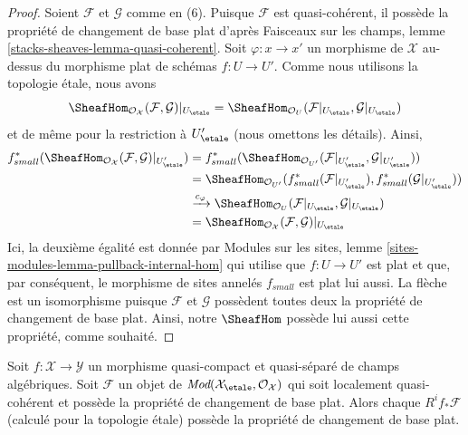 \begin{proof}
\medskip\noindent
Soient $\mathcal{F}$ et $\mathcal{G}$ comme en (6). Puisque $\mathcal{F}$
est quasi-cohérent, il possède la propriété de changement de base plat d'après
Faisceaux sur les champs, lemme \ref{stacks-sheaves-lemma-quasi-coherent}.
Soit $\varphi : x \to x'$ un morphisme de $\mathcal{X}$ au-dessus
du morphisme plat de schémas $f : U \to U'$.
Comme nous utilisons la topologie étale, nous avons
$$
\SheafHom_{\mathcal{O}_\mathcal{X}}(\mathcal{F}, \mathcal{G})|_{U_\etale} =
\SheafHom_{\mathcal{O}_U}(\mathcal{F}|_{U_\etale}, \mathcal{G}|_{U_\etale})
$$
et de même pour la restriction à $U'_\etale$ (nous omettons les détails). Ainsi,
\begin{align*}
f_{small}^*(
\SheafHom_{\mathcal{O}_\mathcal{X}}(\mathcal{F}, \mathcal{G})|_{U'_\etale})
& =
f_{small}^*(
\SheafHom_{\mathcal{O}_{U'}}(
\mathcal{F}|_{U'_\etale}, \mathcal{G}|_{U'_\etale})) \\
& =
\SheafHom_{\mathcal{O}_{U'}}(
f_{small}^*(\mathcal{F}|_{U'_\etale}),
f_{small}^*(\mathcal{G}|_{U'_\etale})) \\
& \xrightarrow{c_\varphi}
\SheafHom_{\mathcal{O}_U}(\mathcal{F}|_{U_\etale}, \mathcal{G}|_{U_\etale}) \\
& =
\SheafHom_{\mathcal{O}_\mathcal{X}}(\mathcal{F}, \mathcal{G})|_{U_\etale}
\end{align*}
Ici, la deuxième égalité est donnée par
Modules sur les sites, lemme \ref{sites-modules-lemma-pullback-internal-hom}
qui utilise que $f : U \to U'$ est plat et que, par conséquent, le morphisme
de sites annelés $f_{small}$ est plat lui aussi.
La flèche est un isomorphisme puisque $\mathcal{F}$ et $\mathcal{G}$
possèdent toutes deux la propriété de changement de base plat. Ainsi, notre $\SheafHom$
possède lui aussi cette propriété, comme souhaité.
\end{proof}

\begin{lemma}
\label{lemma-flat-comparison}
Soit $f : \mathcal{X} \to \mathcal{Y}$ un morphisme quasi-compact et
quasi-séparé de champs algébriques. Soit
$\mathcal{F}$ un objet de
$\textit{Mod}(\mathcal{X}_\etale, \mathcal{O}_\mathcal{X})$
qui soit localement quasi-cohérent et possède la propriété de changement de base plat.
Alors chaque $R^if_*\mathcal{F}$ (calculé pour la topologie étale)
possède la propriété de changement de base plat.
\end{lemma}

